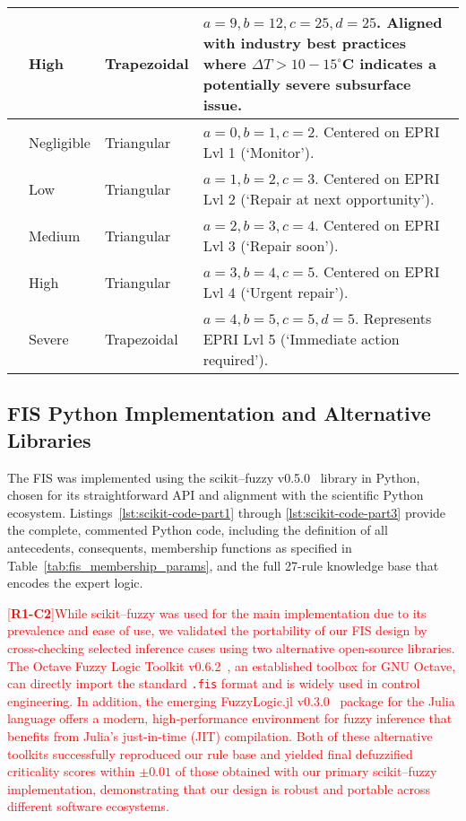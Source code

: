 \documentclass[energies,supfile,submit,pdftex,moreauthors]{Definitions/mdpi}
\newcommand{\revtag}[2]{[\textbf{R#1-C#2}]}
\newcommand{\Rone}[1]{\textcolor{red}{#1}}
\begin{document}
\begin{table}[!htb]
\begin{tabularx}{\textwidth}{l l l X}
            & High   & Trapezoidal & \(a=9, b=12, c=25, d=25\). Aligned with industry best practices where \(\Delta T > 10-15^\circ\)C indicates a potentially severe subsurface issue. \\
\midrule
{} & Negligible & Triangular & \(a=0, b=1, c=2\). Centered on EPRI Lvl 1 (`Monitor'). \\
            & Low        & Triangular & \(a=1, b=2, c=3\). Centered on EPRI Lvl 2 (`Repair at next opportunity'). \\
            & Medium     & Triangular & \(a=2, b=3, c=4\). Centered on EPRI Lvl 3 (`Repair soon'). \\
            & High       & Triangular & \(a=3, b=4, c=5\). Centered on EPRI Lvl 4 (`Urgent repair'). \\
            & Severe     & Trapezoidal & \(a=4, b=5, c=5, d=5\). Represents EPRI Lvl 5 (`Immediate action required'). \\
\bottomrule
\end{tabularx}
\end{table}

\subsection{FIS Python Implementation and Alternative Libraries}
The FIS was implemented using the scikit–fuzzy v0.5.0~\cite{warner2018scikitfuzzy} library in Python, chosen for its straightforward API and alignment with the scientific Python ecosystem. Listings~\ref{lst:scikit-code-part1} through \ref{lst:scikit-code-part3} provide the complete, commented Python code, including the definition of all antecedents, consequents, membership functions as specified in Table~\ref{tab:fis_membership_params}, and the full 27-rule knowledge base that encodes the expert logic.

\Rone{\revtag{1}{2}While scikit–fuzzy was used for the main implementation due to its prevalence and ease of use, we validated the portability of our FIS design by cross‑checking selected inference cases using two alternative open-source libraries. The Octave Fuzzy Logic Toolkit v0.6.2~\cite{octavefuzzytoolkit2007}, an established toolbox for GNU Octave, can directly import the standard \texttt{.fis} format and is widely used in control engineering. In addition, the emerging FuzzyLogic.jl v0.3.0~\cite{fuzzylogicjl2020} package for the Julia language offers a modern, high‑performance environment for fuzzy inference that benefits from Julia's just‑in‑time (JIT) compilation. Both of these alternative toolkits successfully reproduced our rule base and yielded final defuzzified criticality scores within \(\pm0.01\) of those obtained with our primary scikit–fuzzy implementation, demonstrating that our design is robust and portable across different software ecosystems.}
\end{document}
